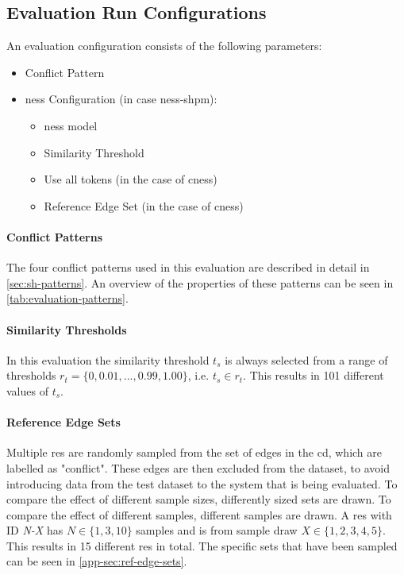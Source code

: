 \documentclass[11pt]{scrreprt}
\begin{document}
{\subsection{Evaluation Run Configurations}
An evaluation configuration consists of the following parameters: 
\begin{itemize}
	\item Conflict Pattern
	\item \gls{ness} Configuration (in case \gls{ness-shpm}): 
	\begin{itemize}
		\item \gls{ness} model
		\item Similarity Threshold 
		\item Use  all tokens (in the case of \gls{cness}) 
		\item Reference Edge Set (in the case of \gls{cness}) 
	\end{itemize}
\end{itemize}

\paragraph{Conflict Patterns}
The four conflict patterns used in this evaluation are described in detail in \cref{sec:sh-patterns}. An overview of the properties of these patterns can be seen in \cref{tab:evaluation-patterns}.


\paragraph{Similarity Thresholds}
In this evaluation the similarity threshold \(t_s\) is always selected from a range of thresholds \(r_t = \{0, 0.01, ...,  0.99, 1.00\}\), i.e. \(t_s \in r_t\). This results in 101 different values of \(t_s\).


\paragraph{Reference Edge Sets}
Multiple \gls{res}  are randomly sampled from the set of edges in the \gls{cd}, which are labelled as "conflict". These edges are then excluded from the dataset, to avoid introducing data from the test dataset to the system that is being evaluated. To compare the effect of different sample sizes, differently sized sets are drawn. To compare the effect of different samples, different samples are drawn. A \gls{res} with ID \textit{N-X} has \(N \in \{1, 3, 10\}\) samples and is from sample draw \(X \in \{1, 2, 3, 4, 5\}\). This results in 15 different \gls{res} in total. The specific sets that have been sampled can be seen in \cref{app-sec:ref-edge-sets}.


}
\end{document}

